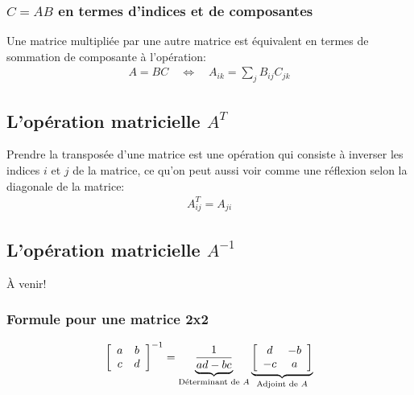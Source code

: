 \subsubsection{$C = A B $ en termes d'indices et de composantes}
Une matrice multipliée par une autre matrice est équivalent en termes de sommation de composante à l'opération:
\begin{align}
A  = B C
\quad \Leftrightarrow \quad
A_{ik} = \sum_j{B_{ij} C_{jk} }
\end{align}



\subsection{L'opération matricielle $A^T$}

Prendre la transposée d'une matrice est une opération qui consiste à inverser les indices $i$ et $j$ de la matrice, ce qu'on peut aussi voir comme une réflexion selon la diagonale de la matrice:
\begin{align}
A^{T}_{ij} = A_{ji}
\end{align}

\subsection{L'opération matricielle $A^{-1}$}

À venir!

\subsubsection{Formule pour une matrice 2x2}
\begin{align}
\left[ \begin{array}{c c } 
a      &   b   \\ 
c      &   d 
\end{array} \right]^{-1}
=
\underbrace{
\frac{1}{ad-bc}
}_{\text{Déterminant de $A$}}
\underbrace{
\left[ \begin{array}{c c } 
d      &   -b   \\ 
-c     &    a 
\end{array} \right]
}_{\text{Adjoint de $A$}}
\end{align}


